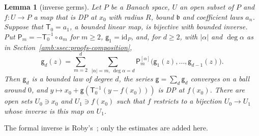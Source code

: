 \documentclass[11pt]{amsart}
\newtheorem{lemma}[theorem]{Lemma}
\theoremstyle{definition}
\theoremstyle{remark}
\numberwithin{equation}{section}
\newcommand{\id}{\mathrm{id}}
\newcommand{\abs}[1]{\lvert #1\rvert}
\theoremstyle{plain}
\theoremstyle{definition}
\theoremstyle{plain}
\begin{document}
\begin{lemma}[inverse germs]\label{amb:lem:inverse}
Let $P$ be a Banach space, $U$ an open subset of $P$ and $f\colon U\to P$ a map that is DP at $x_0$ with radius $R$, bound $\mathfrak b$
and coefficient laws $a_n$. Suppose that $\mathsf T_0=a_1$, a bounded linear map, is bijective with bounded inverse. Put
$\mathsf P_m=-\mathsf T_0^{-1}\circ a_m$ for $m\ge2$, $\mathsf g_1=\id_P$, and, for $d\ge2$, with $\abs\alpha$ and $\deg\alpha$ as in
Section~\ref{amb:ssec:proofs-composition},
\begin{equation}\label{amb:d:eq:inverse-recursion}
 \mathsf g_d(z)=\sum_{m=2}^d\ \sum_{\abs\alpha=m,\ \deg\alpha=d}\mathsf P_m^{[\alpha]}\bigl(\mathsf g_1(z),\dots,\mathsf g_{d-1}(z)\bigr).
\end{equation}
Then $\mathsf g_d$ is a bounded law of degree $d$, the series $\mathsf g=\sum_d\mathsf g_d$ converges on a ball around $0$, and
$y\mapsto x_0+\mathsf g(\mathsf T_0^{-1}(y-f(x_0)))$ is DP at $f(x_0)$. There are open sets $U_0\ni x_0$ and $U_1\ni f(x_0)$ such
that $f$ restricts to a bijection $U_0\to U_1$ whose inverse is this map on $U_1$.
\end{lemma}

The formal inverse is Roby's~\cite[Th.~VI.3, Prop.~VI.8]{Ro}; only the estimates are added here.
\end{document}
